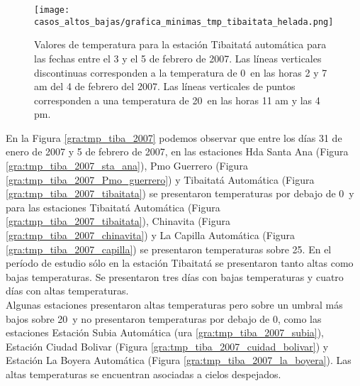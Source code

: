 \begin{figure}[H]
    \centering
    \texttt{[image: casos\_altos\_bajas/grafica\_minimas\_tmp\_tibaitata\_helada.png]}
    \caption{Valores de temperatura para la estación Tibaitatá automática para las fechas entre el 3 y el 5 de febrero de 2007. Las líneas verticales discontinuas corresponden a la temperatura de 0\celc\ en las horas 2 y 7 am del 4 de febrero del 2007. Las líneas verticales de puntos corresponden a una temperatura de 20\celc\ en las horas 11 am y las 4 pm.}
    \label{fig:tmp_autom_tibaitata}
\end{figure}

En la Figura \ref{gra:tmp_tiba_2007} podemos observar que entre los días 31 de enero de 2007 y 5 de febrero de 2007, en las estaciones Hda Santa Ana (Figura \ref{gra:tmp_tiba_2007_sta_ana}), Pmo Guerrero (Figura \ref{gra:tmp_tiba_2007_Pmo_guerrero}) y Tibaitatá Automática (Figura \ref{gra:tmp_tiba_2007_tibaitata}) se presentaron temperaturas por debajo de 0\celc\ y para las estaciones Tibaitatá Automática (Figura \ref{gra:tmp_tiba_2007_tibaitata}), Chinavita (Figura \ref{gra:tmp_tiba_2007_chinavita}) y La Capilla Automática (Figura \ref{gra:tmp_tiba_2007_capilla}) se presentaron temperaturas sobre 25\celc. En el período de estudio sólo en la estación Tibaitatá se presentaron tanto altas como bajas temperaturas. Se presentaron tres días con bajas temperaturas y cuatro días con altas temperaturas.\\

Algunas estaciones presentaron altas temperaturas pero sobre un umbral más bajos sobre 20\celsius\, y no presentaron temperaturas por debajo de 0\celsius, como las estaciones Estación Subia Automática (ura \ref{gra:tmp_tiba_2007_subia}), Estación Ciudad Bolivar (Figura \ref{gra:tmp_tiba_2007_cuidad_bolivar}) y Estación La Boyera Automática (Figura \ref{gra:tmp_tiba_2007_la_boyera}). Las altas temperaturas se encuentran asociadas a cielos despejados.\\

